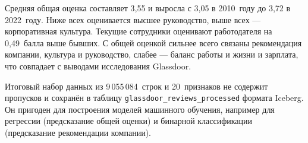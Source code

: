 Средняя общая оценка составляет 3,55 и выросла с 3,05 в 2010~году до 3,72 в 2022~году. Ниже всех оценивается высшее руководство, выше всех --- корпоративная культура. Текущие сотрудники оценивают работодателя на 0,49~балла выше бывших. С общей оценкой сильнее всего связаны рекомендация компании, культура и руководство, слабее --- баланс работы и жизни и зарплата, что совпадает с выводами исследования Glassdoor.

Итоговый набор данных из 9\,055\,084~строк и 20~признаков не содержит пропусков и сохранён в таблицу \texttt{glassdoor\_reviews\_processed} формата Iceberg. Он пригоден для построения моделей машинного обучения, например для регрессии (предсказание общей оценки) и бинарной классификации (предсказание рекомендации компании).
